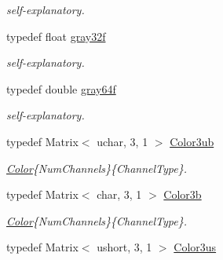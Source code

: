 \begin{DoxyCompactItemize}
\begin{DoxyCompactList}\small\item\em self-\/explanatory. \end{DoxyCompactList}\item 
\hypertarget{group___color_types_ga9c8a72eb9c04233172157ab5e7d0be22}{typedef float \hyperlink{group___color_types_ga9c8a72eb9c04233172157ab5e7d0be22}{gray32f}}\label{group___color_types_ga9c8a72eb9c04233172157ab5e7d0be22}

\begin{DoxyCompactList}\small\item\em self-\/explanatory. \end{DoxyCompactList}\item 
\hypertarget{group___color_types_gaf5100147ede5b7f434dc4238668a3c13}{typedef double \hyperlink{group___color_types_gaf5100147ede5b7f434dc4238668a3c13}{gray64f}}\label{group___color_types_gaf5100147ede5b7f434dc4238668a3c13}

\begin{DoxyCompactList}\small\item\em self-\/explanatory. \end{DoxyCompactList}\item 
\hypertarget{group___color_types_ga018b76cd00a4f9dca7dd06246d5bd3aa}{typedef Matrix$<$ uchar, 3, 1 $>$ \hyperlink{group___color_types_ga018b76cd00a4f9dca7dd06246d5bd3aa}{Color3ub}}\label{group___color_types_ga018b76cd00a4f9dca7dd06246d5bd3aa}

\begin{DoxyCompactList}\small\item\em \hyperlink{class_d_o_1_1_color}{Color}\{Num\-Channels\}\{Channel\-Type\}. \end{DoxyCompactList}\item 
\hypertarget{group___color_types_ga1f41bb6772fe8bff45c855c578c739d1}{typedef Matrix$<$ char, 3, 1 $>$ \hyperlink{group___color_types_ga1f41bb6772fe8bff45c855c578c739d1}{Color3b}}\label{group___color_types_ga1f41bb6772fe8bff45c855c578c739d1}

\begin{DoxyCompactList}\small\item\em \hyperlink{class_d_o_1_1_color}{Color}\{Num\-Channels\}\{Channel\-Type\}. \end{DoxyCompactList}\item 
\hypertarget{group___color_types_ga4db675bfc61fec77a5524f279f46d07a}{typedef Matrix$<$ ushort, 3, 1 $>$ \hyperlink{group___color_types_ga4db675bfc61fec77a5524f279f46d07a}{Color3us}}\label{group___color_types_ga4db675bfc61fec77a5524f279f46d07a}


\end{DoxyCompactItemize}
